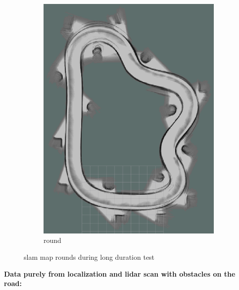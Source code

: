 \begin{figure}[H]
\begin{subfigure}{.3\linewidth}
		\includegraphics[width=\textwidth]{Pictures/2slamtest7}
		\caption{ round}
	\end{subfigure}

	\caption{slam map rounds during long duration test}
	\label{3slamtest}

\end{figure}


\textbf{Data purely from localization and lidar scan with obstacles on the road:}\\

